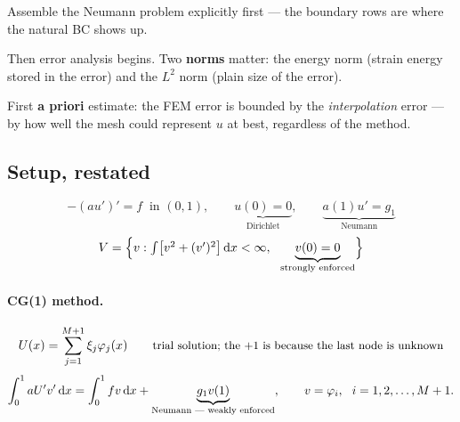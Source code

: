 
\begin{roadmap}[Lecture 6]
\begin{roadlist}
\item Assemble the Neumann problem explicitly first --- the boundary rows are
  where the natural BC shows up.
\item Then error analysis begins. Two \textbf{norms} matter: the energy norm
  (strain energy stored in the error) and the $L^{2}$ norm (plain size of the
  error).
\item First \textbf{a priori} estimate: the FEM error is bounded by the
  \emph{interpolation} error --- by how well the mesh could represent $u$ at
  best, regardless of the method.
\end{roadlist}
\end{roadmap}

\subsection*{Setup, restated}

\begin{equation}
  -(au')'=f \ \text{ in }(0,1),
  \qquad
  \underbrace{u(0)=0}_{\text{Dirichlet}},
  \qquad
  \underbrace{a(1)u'=g_{1}}_{\text{Neumann}}
\end{equation}
\begin{equation}
  \Vsp=\Bigl\{v:\textstyle\int\bigl[v^{2}+(v')^{2}\bigr]\dx<\infty,\ \
  \underbrace{v(0)=0}_{\text{strongly enforced}}\Bigr\}
\end{equation}

\paragraph{CG(1) method.}
\begin{equation}
  U(x)=\sum_{j=1}^{M+1}\xi_{j}\varphi_{j}(x)
  \qquad
  \text{\small trial solution; the $+1$ is because the last node is unknown}
\end{equation}
\begin{equation}\label{eq:neuweak}
  \int_{0}^{1} a U'v'\,\mathrm{d} x = \int_{0}^{1} f v\,\mathrm{d} x
  + \underbrace{g_{1}v(1)}_{\text{Neumann --- weakly enforced}},
  \qquad v=\varphi_{i},\ \ i=1,2,\dots,M+1 .
\end{equation}

